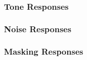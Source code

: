  \subsubsection{Tone Responses}




 \subsubsection{Noise Responses}


 \subsubsection{Masking Responses}


